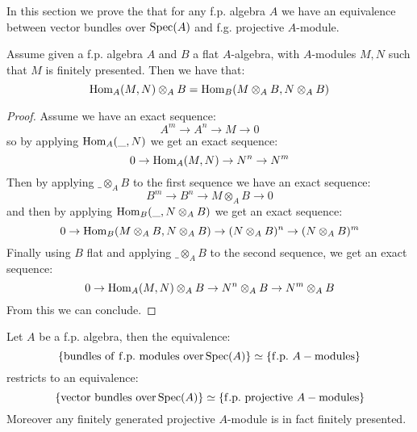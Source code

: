 In this section we prove the that for any f.p. algebra $A$ we have an equivalence between vector bundles over $\operatorname{Spec}(A)$ and f.g. projective $A$-module.

\begin{lemma}\label{localisation-hom}
Assume given a f.p. algebra $A$ and $B$ a flat $A$-algebra, with $A$-modules $M,N$ such that $M$ is finitely presented. Then we have that:
\[ \mathrm{Hom}_A(M,N) \otimes_AB = \mathrm{Hom}_B(M\otimes_AB,N\otimes_AB) \] 
\end{lemma}

\begin{proof}
Assume we have an exact sequence:
\[A^m\to A^n\to M\to 0\]
so by applying $\mathrm{Hom}_A(\_,N)$ we get an exact sequence:
\[0\to \mathrm{Hom}_A(M,N) \to N^n \to N^m\]
Then by applying $\_\otimes_AB$ to the first sequence we have an exact sequence:
\[B^m\to B^n\to M\otimes_AB\to 0\]
and then by applying $\mathrm{Hom}_B(\_,N\otimes_AB)$ we get an exact sequence:
\[0\to \mathrm{Hom}_B(M\otimes_AB,N\otimes_AB) \to (N\otimes_AB)^n \to (N\otimes_AB)^m\]
Finally using $B$ flat and applying $\_\otimes_AB$ to the second sequence, we get an exact sequence:
\[0\to \mathrm{Hom}_A(M,N)\otimes_AB \to N^n \otimes_AB \to N^m\otimes_AB\]
From this we can conclude.
\end{proof}

\begin{proposition}
Let $A$ be a f.p. algebra, then the equivalence:
\[\{\mathrm{bundles\ of\ f.p.\ modules\ over} \operatorname{Spec}(A)\} \simeq \{\mathrm{f.p.}\ A-\mathrm{modules}\}\] 
restricts to an equivalence:
\[\{\mathrm{vector\ bundles\ over} \operatorname{Spec}(A)\} \simeq \{\mathrm{f.p.\ projective}\ A-\mathrm{modules}\}\] 
Moreover any finitely generated projective $A$-module is in fact finitely presented.
\end{proposition}

